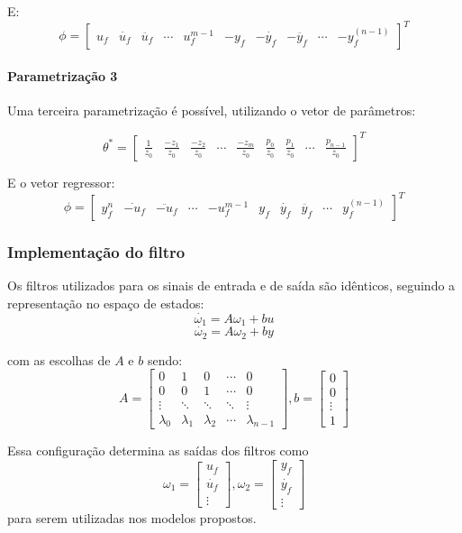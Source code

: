 \documentclass[10pt]{article}
\begin{document}
E:
$$\phi = \begin{bmatrix}
    u_f & \dot{u_f} & \ddot{u_f} & \cdots & u_f^{m-1} & -y_f & -\dot{y_f} & -\ddot{y_f} & \cdots & -y^{(n-1)}_f
\end{bmatrix}^T
$$

\paragraph{Parametrização 3}

Uma terceira parametrização é possível, utilizando o vetor de parâmetros:

$$\theta^* = \begin{bmatrix}
    \frac{1}{z_0} & \frac{-z_1}{z_0} & \frac{-z_2}{z_0}& \cdots & \frac{-z_m}{z_0} & \frac{p_0}{z_0} & \frac{p_1}{z_0} & \cdots & \frac{p_{n-1}}{z_0}
\end{bmatrix}^T
$$

E o vetor regressor:
$$\phi = \begin{bmatrix}
    y_f^{n} & \dot{-u_f} & \ddot{-u_f} & \cdots & -u_f^{m-1}& y_f & \dot{y_f} & \ddot{y_f} & \cdots & y^{(n-1)}_f
\end{bmatrix}^T
$$

\subsubsection{Implementação do filtro}

Os filtros utilizados para os sinais de entrada e de saída são idênticos, seguindo a representação no espaço de estados:
$$
\dot{\omega_1} = A\omega_1 + bu
$$
$$
\dot{\omega_2} = A\omega_2 + by
$$

com as escolhas de $A$ e $b$ sendo:
$$
A = \begin{bmatrix}
    0 & 1 & 0 & \cdots & 0\\ 0 & 0 & 1 & \cdots & 0 \\ \vdots & \ddots & \ddots & \ddots & \vdots \\ \lambda_0 & \lambda_1 & \lambda_2 & \cdots & \lambda_{n-1}
\end{bmatrix},
b = \begin{bmatrix}
    0 \\ 0 \\ \vdots \\ 1
\end{bmatrix}
$$

Essa configuração determina as saídas dos filtros como 
$$ \omega_1 = \begin{bmatrix}
    u_f \\ \dot{u_f} \\ \vdots
\end{bmatrix}
,  \omega_2 = \begin{bmatrix}
    y_f \\ \dot{y_f} \\ \vdots
\end{bmatrix}
$$
para serem utilizadas nos modelos propostos.
\end{document}

